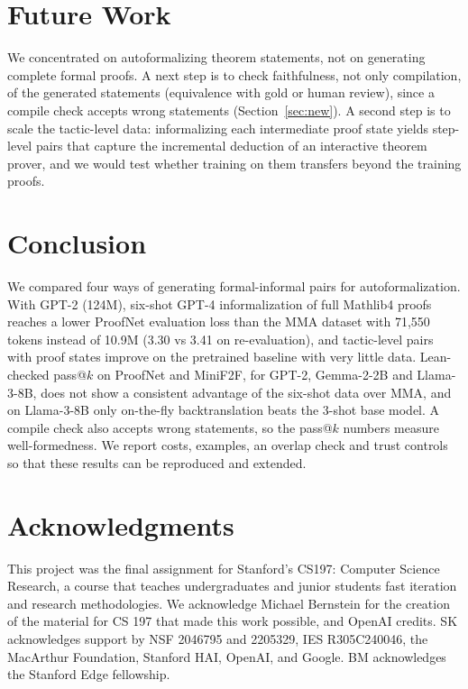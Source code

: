 \documentclass{article} %
\begin{document}
\section{Future Work}

We concentrated on autoformalizing theorem statements, not on generating complete formal proofs. A next step is to check faithfulness, not only compilation, of the generated statements (equivalence with gold or human review), since a compile check accepts wrong statements (Section~\ref{sec:new}). A second step is to scale the tactic-level data: informalizing each intermediate proof state yields step-level pairs that capture the incremental deduction of an interactive theorem prover, and we would test whether training on them transfers beyond the training proofs.

\section{Conclusion}
We compared four ways of generating formal-informal pairs for autoformalization. With GPT-2 (124M), six-shot GPT-4 informalization of full Mathlib4 proofs reaches a lower ProofNet evaluation loss than the MMA dataset with 71,550 tokens instead of 10.9M (3.30 vs 3.41 on re-evaluation), and tactic-level pairs with proof states improve on the pretrained baseline with very little data. Lean-checked pass@$k$ on ProofNet and MiniF2F, for GPT-2, Gemma-2-2B and Llama-3-8B, does not show a consistent advantage of the six-shot data over MMA, and on Llama-3-8B only on-the-fly backtranslation beats the 3-shot base model. A compile check also accepts wrong statements, so the pass@$k$ numbers measure well-formedness. We report costs, examples, an overlap check and trust controls so that these results can be reproduced and extended.

\section{Acknowledgments}
This project was the final assignment for Stanford's CS197: Computer Science Research, a course that teaches undergraduates and junior students fast iteration and research methodologies.
We acknowledge Michael Bernstein for the creation of the material for CS 197 that made this work possible, and OpenAI credits.
SK acknowledges support by NSF 2046795 and 2205329, IES R305C240046, the MacArthur Foundation, Stanford HAI, OpenAI, and Google. 
BM acknowledges the Stanford Edge fellowship.
\end{document}
